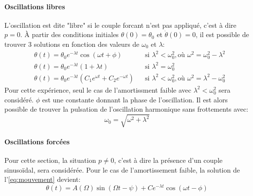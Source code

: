 \paragraph*{Oscillations libres}
L'oscillation est dite "libre" si le couple forcant n'est pas appliqué, c'est à dire \(p = 0\). À partir des conditions initiales \(\theta(0) = \theta_0\) et \(\dot\theta(0) = 0\), il est possible de trouver 3 solutions en fonction des valeurs de \(\omega_0\) et \(\lambda\):
\begin{align}
    \label{eq:oscil_libre}
    &\theta(t) = \theta_0 e^{-\lambda t} \cos (\omega t + \phi) &&\textrm{si } \lambda^2 < \omega_0^2, \textrm{où } \omega^2 = \omega_0^2 - \lambda^2 \\
    &\theta(t) = \theta_0 e^{-\lambda t} (1 + \lambda t) &&\textrm{si } \lambda^2 = \omega_0^2 \\
    &\theta(t) = \theta_0 e^{-\lambda t} \left(C_1e^{\omega t} + C_2e^{-\omega t}\right) &&\textrm{si } \lambda^2 < \omega_0^2, \textrm{où } \omega^2 = \lambda^2 - \omega_0^2
\end{align}
Pour cette expérience, seul le cas de l'amortissment faible avec \(\lambda^2 < \omega_0^2\) sera considéré. \(\phi\) est une constante donnant la phase de l'oscillation. Il est alors possible de trouver la pulsation de l'oscillation harmonique sans frottements avec:
\begin{equation}
    \omega_0 = \sqrt{\omega^2 + \lambda^2}
    \label{eq:omega_0}
\end{equation}

\paragraph*{Oscillations forcées}
Pour cette section, la situation \(p \ne 0\), c'est à dire la présence d'un couple sinusoïdal, sera considérée. Pour le cas de l'amortissement faible, la solution de l'\autoref{eq:mouvement} devient:
\begin{equation}
    \theta(t) = A(\Omega) \sin(\Omega t - \psi) + C e^{-\lambda t} \cos(\omega t - \phi)
    \label{eq:oscillations_forcees}
\end{equation}

